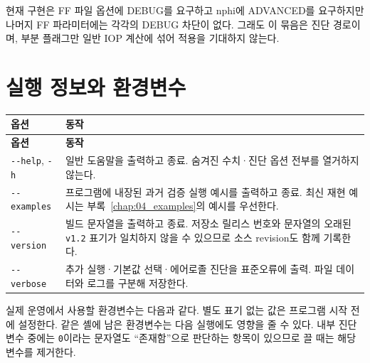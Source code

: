 현재 구현은 FF 파일 옵션에 DEBUG를 요구하고 nphi에 ADVANCED를 요구하지만 나머지 FF 파라미터에는 각각의 DEBUG 차단이 없다. 그래도 이 묶음은 진단 경로이며, 부분 플래그만 일반 IOP 계산에 섞어 적용을 기대하지 않는다.

\section{실행 정보와 환경변수}
\label{sec:auto:03_options:10}

{\TableFont
\begin{longtable}{@{}>{\raggedright\arraybackslash}p{}>{\raggedright\arraybackslash}p{}@{}}
\toprule
\textbf{옵션} & \textbf{동작} \\
\midrule
\endfirsthead
\toprule
\textbf{옵션} & \textbf{동작} \\
\midrule
\endhead
\bottomrule
\endfoot
\texttt{-\allowbreak{}-\allowbreak{}help}, \texttt{-\allowbreak{}h} & 일반 도움말을 출력하고 종료. 숨겨진 수치·진단 옵션 전부를 열거하지 않는다. \\
\texttt{-\allowbreak{}-\allowbreak{}examples} & 프로그램에 내장된 과거 검증 실행 예시를 출력하고 종료. 최신 재현 예시는 부록~\ref{chap:04_examples}의 예시를 우선한다. \\
\texttt{-\allowbreak{}-\allowbreak{}version} & 빌드 문자열을 출력하고 종료. 저장소 릴리스 번호와 문자열의 오래된 \texttt{v1.\allowbreak{}2} 표기가 일치하지 않을 수 있으므로 소스 revision도 함께 기록한다. \\
\texttt{-\allowbreak{}-\allowbreak{}verbose} & 추가 실행·기본값 선택·에어로졸 진단을 표준오류에 출력. 파일 데이터와 로그를 구분해 저장한다. \\
\end{longtable}
}

실제 운영에서 사용할 환경변수는 다음과 같다. 별도 표기 없는 값은 프로그램 시작 전에 설정한다. 같은 셸에 남은 환경변수는 다음 실행에도 영향을 줄 수 있다. 내부 진단 변수 중에는 \texttt{0}이라는 문자열도 “존재함”으로 판단하는 항목이 있으므로 끌 때는 해당 변수를 제거한다.


